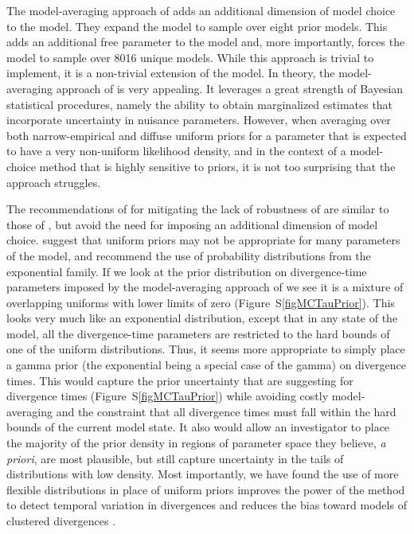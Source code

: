 The model-averaging approach of \citet{Hickerson2013} adds an additional
dimension of model choice to the model.
They expand the model to sample over eight prior models.
This adds an additional free parameter to the model and, more importantly,
forces the model to sample over 8016 unique models.
While this approach is trivial to implement, it is a non-trivial extension of
the model.
In theory, the model-averaging approach of \citet{Hickerson2013} is very
appealing.
It leverages a great strength of Bayesian statistical procedures, namely the
ability to obtain marginalized estimates that incorporate uncertainty in
nuisance parameters.
However, when averaging over both narrow-empirical and diffuse uniform priors
for a parameter that is expected to have a very non-uniform likelihood density,
and in the context of a model-choice method that is highly sensitive to priors,
it is not too surprising that the approach struggles.

The recommendations of \citet{Oaks2012} for mitigating the lack of robustness
of \msb are similar to those of \citet{Hickerson2013}, but avoid the
need for imposing an additional dimension of model choice.
\citet{Oaks2012} suggest that uniform priors may not be appropriate for many
parameters of the \msb model, and recommend the use of probability
distributions from the exponential family.
If we look at the prior distribution on divergence-time parameters imposed by
the model-averaging approach of \citet{Hickerson2013} we see it is a mixture of
overlapping uniforms with lower limits of zero (Figure~S\ref{figMCTauPrior}).
This looks very much like an exponential distribution, except that in any state
of the model, all the divergence-time parameters are restricted to the hard
bounds of one of the uniform distributions.
Thus, it seems more appropriate to simply place a gamma prior (the exponential
being a special case of the gamma) on divergence times.
This would capture the prior uncertainty that \citet{Hickerson2013} are
suggesting for divergence times (Figure~S\ref{figMCTauPrior}) while avoiding
costly model-averaging and the constraint that all divergence times must fall
within the hard bounds of the current model state.
It also would allow an investigator to place the majority of the prior density
in regions of parameter space they believe, \emph{a priori}, are most
plausible, but still capture uncertainty in the tails of distributions with low
density.
Most importantly, we have found the use of more flexible distributions in place
of uniform priors improves the power of the method to detect temporal variation
in divergences and reduces the bias toward models of clustered divergences
\citep{Oaks2014dpp}.



